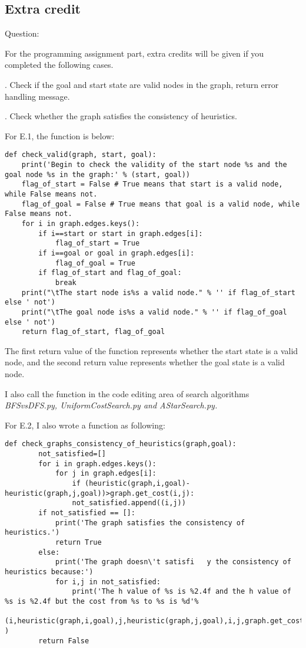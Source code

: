 \documentclass[aps,letterpaper,10pt]{revtex4}
\begin{document}
\vspace{3mm}

\subsection{Extra credit}
\noindent
Question:

For the programming assignment part, extra credits will be given if you completed the following cases.

. Check if the goal and start state are valid nodes in the graph, return error handling message.

. Check whether the graph satisfies the consistency of heuristics.
\vspace{3mm}

For E.1, the function is below:
\begin{lstlisting}[style = python]
def check_valid(graph, start, goal):
	print('Begin to check the validity of the start node %s and the goal node %s in the graph:' % (start, goal))
	flag_of_start = False # True means that start is a valid node, while False means not.
	flag_of_goal = False # True means that goal is a valid node, while False means not.
	for i in graph.edges.keys():
		if i==start or start in graph.edges[i]:
			flag_of_start = True
		if i==goal or goal in graph.edges[i]:
			flag_of_goal = True
		if flag_of_start and flag_of_goal:
			break
	print("\tThe start node is%s a valid node." % '' if flag_of_start else ' not')
	print("\tThe goal node is%s a valid node." % '' if flag_of_goal else ' not')
	return flag_of_start, flag_of_goal
\end{lstlisting}

The first return value of the function represents whether the start state is a valid node, 
and the second return value represents whether the goal state is a valid node.

I also call the function in the code editing area of search algorithms \emph{BFSvsDFS.py, UniformCostSearch.py \emph{and} AStarSearch.py.}\vspace{3mm}

For E.2, I also wrote a function as following:
\begin{lstlisting}[style = python]
	def check_graphs_consistency_of_heuristics(graph,goal):
    	not_satisfied=[]
    	for i in graph.edges.keys():
        	for j in graph.edges[i]:
            	if (heuristic(graph,i,goal)-heuristic(graph,j,goal))>graph.get_cost(i,j):
                not_satisfied.append((i,j))
    	if not_satisfied == []:
        	print('The graph satisfies the consistency of heuristics.')
        	return True
    	else:
        	print('The graph doesn\'t satisfi	y the consistency of heuristics because:')
        	for i,j in not_satisfied:
            	print('The h value of %s is %2.4f and the h value of %s is %2.4f but the cost from %s to %s is %d'%
            	(i,heuristic(graph,i,goal),j,heuristic(graph,j,goal),i,j,graph.get_cost(i,j)) )
        return False
\end{lstlisting}
\end{document}
